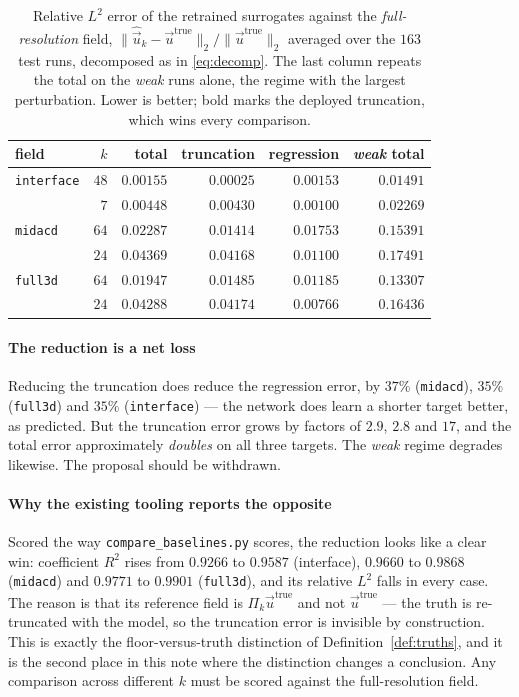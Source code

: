 \documentclass[11pt,a4paper]{article}
\theoremstyle{plain}
\theoremstyle{definition}
\theoremstyle{remark}
\begin{document}
\begin{table}[t]
\centering
\small
\begin{tabular}{@{}lrrrrr@{}}
\toprule
field & $k$ & total & truncation & regression & \textit{weak} total \\
\midrule
\texttt{interface} & $48$ & $\mathbf{0.00155}$ & $0.00025$ & $0.00153$ & $\mathbf{0.01491}$ \\
                   & $7$  & $0.00448$ & $0.00430$ & $0.00100$ & $0.02269$ \\
\texttt{midacd}    & $64$ & $\mathbf{0.02287}$ & $0.01414$ & $0.01753$ & $\mathbf{0.15391}$ \\
                   & $24$ & $0.04369$ & $0.04168$ & $0.01100$ & $0.17491$ \\
\texttt{full3d}    & $64$ & $\mathbf{0.01947}$ & $0.01485$ & $0.01185$ & $\mathbf{0.13307}$ \\
                   & $24$ & $0.04288$ & $0.04174$ & $0.00766$ & $0.16436$ \\
\bottomrule
\end{tabular}
\caption{Relative $L^2$ error of the retrained surrogates against the
\emph{full-resolution} field, $\|\widehat{\vec u}_k - \vec u^{\mathrm{true}}\|_2
/ \|\vec u^{\mathrm{true}}\|_2$ averaged over the $163$ test runs, decomposed as
in \eqref{eq:decomp}. The last column repeats the total on the
\textit{weak} runs alone, the regime with the largest perturbation. Lower is
better; bold marks the deployed truncation, which wins every comparison.}
\label{tab:truncation}
\end{table}

\label{meas:trunc-loss}
\paragraph{The reduction is a net loss}
Reducing the truncation does reduce the regression error, by $37\%$
(\texttt{midacd}), $35\%$ (\texttt{full3d}) and $35\%$ (\texttt{interface}) ---
the network does learn a shorter target better, as predicted. But the truncation
error grows by factors of $2.9$, $2.8$ and $17$, and the total error
approximately \emph{doubles} on all three targets. The \textit{weak} regime
degrades likewise. The proposal should be withdrawn.

\label{rem:artefact}
\paragraph{Why the existing tooling reports the opposite}
Scored the way \texttt{compare\_baselines.py} scores, the reduction looks like a
clear win: coefficient $R^2$ rises from $0.9266$ to $0.9587$ (interface),
$0.9660$ to $0.9868$ (\texttt{midacd}) and $0.9771$ to $0.9901$
(\texttt{full3d}), and its relative $L^2$ falls in every case. The reason is
that its reference field is $\Pi_k\vec{u}^{\mathrm{true}}$ and not
$\vec{u}^{\mathrm{true}}$ --- the truth is re-truncated with the model, so the
truncation error is invisible by construction. This is exactly the
floor-versus-truth distinction of Definition~\ref{def:truths}, and it is the second
place in this note where the distinction changes a conclusion. Any comparison
across different $k$ must be scored against the full-resolution field.
\end{document}
